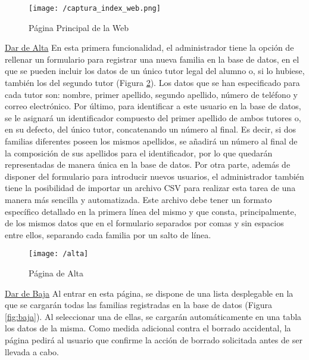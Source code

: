 \begin{figure}[!h]
	\begin{center}
		\texttt{[image: /captura\_index\_web.png]}
		\caption{Página Principal de la Web}
		\label{fig:index_web}
	\end{center}
\end{figure}

\clearpage

\noindent \underline{Dar de Alta} \newline
En esta primera funcionalidad, el administrador tiene la opción de rellenar un formulario para registrar una nueva familia en la base de datos, en el que se pueden incluir los datos de un único tutor legal del alumno o, si lo hubiese, también los del segundo tutor (Figura \ref{fig:alta}). Los datos que se han especificado para cada tutor son: nombre, primer apellido, segundo apellido, número de teléfono y correo electrónico. Por último, para identificar a este usuario en la base de datos, se le asignará un identificador compuesto del primer apellido de ambos tutores o, en su defecto, del único tutor, concatenando un número al final. Es decir, si dos familias diferentes poseen los mismos apellidos, se añadirá un número al final de la composición de sus apellidos para el identificador, por lo que quedarán representadas de manera única en la base de datos. Por otra parte, además de disponer del formulario para introducir nuevos usuarios, el administrador también tiene la posibilidad de importar un archivo \acs{CSV} para realizar esta tarea de una manera más sencilla y automatizada. Este archivo debe tener un formato específico detallado en la primera línea del mismo y que consta, principalmente, de los mismos datos que en el formulario separados por comas y sin espacios entre ellos, separando cada familia por un salto de línea.

\begin{figure}[!h]
	\begin{center}
		\texttt{[image: /alta]}
		\caption{Página de Alta}
		\label{fig:alta}
	\end{center}
\end{figure}

\clearpage

\noindent \underline{Dar de Baja} \newline
Al entrar en esta página, se dispone de una lista desplegable en la que se cargarán todas las familias registradas en la base de datos (Figura \ref{fig:baja}). Al seleccionar una de ellas, se cargarán automáticamente en una tabla los datos de la misma. Como medida adicional contra el borrado accidental, la página pedirá al usuario que confirme la acción de borrado solicitada antes de ser llevada a cabo.

